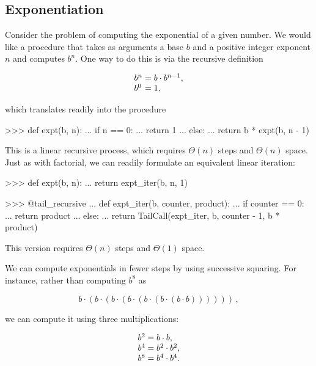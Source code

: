 \subsection{Exponentiation}
\label{Section 1.2.4}

Consider the problem of computing the exponential of a given number.  We would
like a procedure that takes as arguments a base \( b \) and a positive integer
exponent \( n \) and computes \( b^n \).  One way to do this is via the
recursive definition

$$
\begin{array}{l@{{}={}}l}
  b^n & b\cdot b^{n-1}, \\
  b^0 & 1,
\end{array}
$$

\noindent
which translates readily into the procedure

\begin{codeBlock}
>>> def expt(b, n):
...     if n == 0:
...         return 1
...     else:
...         return b * expt(b, n - 1)
\end{codeBlock}

\noindent
This is a linear recursive process, which requires \( \Theta(n) \) steps and
\( \Theta(n) \) space.  Just as with factorial, we can readily formulate an
equivalent linear iteration:

\begin{codeBlock}
>>> def expt(b, n):
...     return expt_iter(b, n, 1)

>>> @tail_recursive
... def expt_iter(b, counter, product):
...     if counter == 0:
...         return product
...     else:
...         return TailCall(expt_iter, b, counter - 1, b * product)
\end{codeBlock}

\noindent
This version requires \( \Theta(n) \) steps and \( \Theta(1) \) space.

We can compute exponentials in fewer steps by using successive squaring.  For
instance, rather than computing \( b^8 \) as

$$ b\cdot (b\cdot (b\cdot (b\cdot (b\cdot (b\cdot (b\cdot b))))))\,, $$

\noindent
we can compute it using three multiplications:

$$
\begin{array}{l@{{}={}}l}
  b^2 & b\cdot b, \\
  b^4 & b^2\cdot b^2, \\
  b^8 & b^4\cdot b^4.
\end{array}
$$

